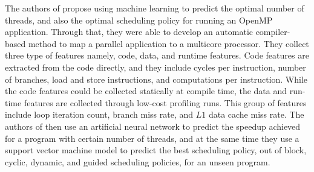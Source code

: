 The authors of \cite{wang2009mapping} propose using machine learning to predict the optimal number of threads, and also the optimal scheduling policy for running an OpenMP application. Through that, they were able to develop an automatic compiler-based method to map a parallel application to a multicore processor. They collect three type of features namely, code, data, and runtime features. Code features are extracted from the code directly, and they include cycles per instruction, number of branches, load and store instructions, and computations per instruction. While the code features could be collected statically at compile time, the data and run-time features are collected through low-cost profiling runs. This group of features include loop iteration count, branch miss rate, and $L1$ data cache miss rate. The authors of \cite{wang2009mapping} then use an artificial neural network to predict the speedup achieved for a program with certain number of threads, and at the same time they use a support vector machine model to predict the best scheduling policy, out of block, cyclic, dynamic, and guided scheduling policies, for an unseen program.



	
	
	
	
%
%
%
%
%	
%
%	
%
\vspace{\baselineskip}


